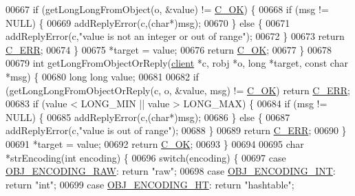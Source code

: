 \begin{DoxyCode}
{00667     \textcolor{keywordflow}{if} (getLongLongFromObject(o, &value) != \hyperlink{server_8h_a303769ef1065076e68731584e758d3e1}{C\_OK}) \{
00668         \textcolor{keywordflow}{if} (msg != NULL) \{
00669             addReplyError(c,(\textcolor{keywordtype}{char}*)msg);
00670         \} \textcolor{keywordflow}{else} \{
00671             addReplyError(c,\textcolor{stringliteral}{"value is not an integer or out of range"});
00672         \}
00673         \textcolor{keywordflow}{return} \hyperlink{server_8h_af98ac28d5f4d23d7ed5985188e6fb7d1}{C\_ERR};
00674     \}
00675     *target = value;
00676     \textcolor{keywordflow}{return} \hyperlink{server_8h_a303769ef1065076e68731584e758d3e1}{C\_OK};
00677 \}
00678 
00679 \textcolor{keywordtype}{int} getLongFromObjectOrReply(\hyperlink{structclient}{client} *c, robj *o, \textcolor{keywordtype}{long} *target, \textcolor{keyword}{const} \textcolor{keywordtype}{char} *msg) \{
00680     \textcolor{keywordtype}{long} \textcolor{keywordtype}{long} value;
00681 
00682     \textcolor{keywordflow}{if} (getLongLongFromObjectOrReply(c, o, &value, msg) != \hyperlink{server_8h_a303769ef1065076e68731584e758d3e1}{C\_OK}) \textcolor{keywordflow}{return} 
      \hyperlink{server_8h_af98ac28d5f4d23d7ed5985188e6fb7d1}{C\_ERR};
00683     \textcolor{keywordflow}{if} (value < LONG\_MIN || value > LONG\_MAX) \{
00684         \textcolor{keywordflow}{if} (msg != NULL) \{
00685             addReplyError(c,(\textcolor{keywordtype}{char}*)msg);
00686         \} \textcolor{keywordflow}{else} \{
00687             addReplyError(c,\textcolor{stringliteral}{"value is out of range"});
00688         \}
00689         \textcolor{keywordflow}{return} \hyperlink{server_8h_af98ac28d5f4d23d7ed5985188e6fb7d1}{C\_ERR};
00690     \}
00691     *target = value;
00692     \textcolor{keywordflow}{return} \hyperlink{server_8h_a303769ef1065076e68731584e758d3e1}{C\_OK};
00693 \}
00694 
00695 \textcolor{keywordtype}{char} *strEncoding(\textcolor{keywordtype}{int} encoding) \{
00696     \textcolor{keywordflow}{switch}(encoding) \{
00697     \textcolor{keywordflow}{case} \hyperlink{server_8h_a148bc85e3074e324a6dc5eebcad1bcd5}{OBJ\_ENCODING\_RAW}: \textcolor{keywordflow}{return} \textcolor{stringliteral}{"raw"};
00698     \textcolor{keywordflow}{case} \hyperlink{server_8h_ae934cf008a0be0ef009c92c2d006a816}{OBJ\_ENCODING\_INT}: \textcolor{keywordflow}{return} \textcolor{stringliteral}{"int"};
00699     \textcolor{keywordflow}{case} \hyperlink{server_8h_a9c10219f68afc557d510d108257d238b}{OBJ\_ENCODING\_HT}: \textcolor{keywordflow}{return} \textcolor{stringliteral}{"hashtable"};
}
\end{DoxyCode}
